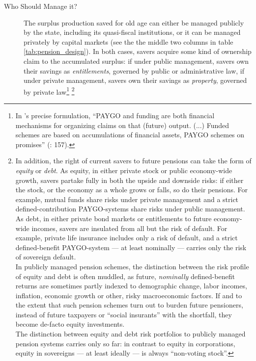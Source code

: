 \documentclass[11pt,a4paper,oneside,openright]{article}
\begin{document}
\begin{description}
	\item[Who Should Manage it?] The surplus production saved for old age can either be managed publicly by the state, including its quasi-fiscal institutions, or it can be managed privately by capital markets (see the the middle two columns in table \ref{tab:pension_design}). 
	In both cases, savers acquire some kind of ownership claim to the accumulated surplus: 
	if under public management, savers own their savings as \emph{entitlements}, governed by public or administrative law, if under private management, savers own their savings as \emph{property}, governed by private law\footnote{
		In \citeauthor{Barr2005a}'s precise formulation, ``PAYGO and funding are both financial mechanisms for organizing claims on that (future) output. 
		(...) 
		Funded schemes are based on accumulations of financial assets, PAYGO schemes on promises'' (\citeyear{Barr2005a}: 157).} \footnote{
		In addition, the right of current savers to future pensions can take the form of \emph{equity} or \emph{debt}. 
		As equity, in either private stock or public economy-wide growth, savers partake fully in both the upside and downside risks: 
		if either the stock, or the economy as a whole grows or falls, so do their pensions. 
		For example, mutual funds share risks under private management and a strict defined-contribution PAYGO-systems share risks under public management. 
		As debt, in either private bond markets or entitlements to future economy-wide incomes, savers are insulated from all but the risk of default. 
		For example, private life insurance includes only a risk of default, and a strict defined-benefit PAYGO-system --- at least nominally --- carries only the risk of sovereign default. \\
		In publicly managed pension schemes, the distinction between the risk profile of equity and debt is often muddled, as future, \emph{nominally} defined-benefit returns are sometimes partly indexed to demographic change, labor incomes, inflation, economic growth or other, risky macroeconomic factors. 
		If and to the extent that such pension schemes turn out to burden future pensioners, instead of future taxpayers or ``social insurants'' with the shortfall, they become de-facto equity investments. \\
		The distinction between equity and debt risk portfolios to publicly managed pension systems carries only so far: 
		in contrast to equity in corporations, equity in sovereigns --- at least ideally --- is always ``non-voting stock''. 
}
\end{description}
\end{document}
